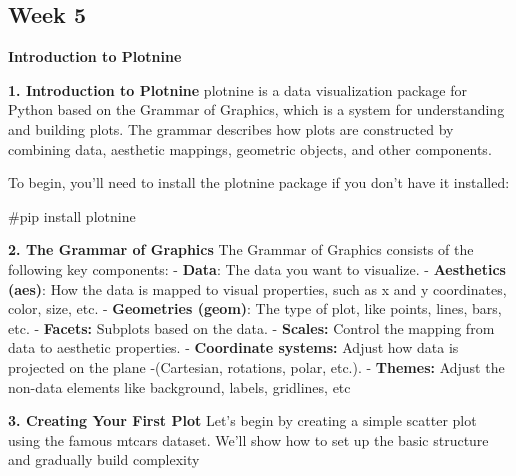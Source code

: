 \documentclass[
  letterpaper,
  DIV=11,
  numbers=noendperiod]{scrreprt}
\newenvironment{Shaded}{\begin{snugshade}}{\end{snugshade}}
\newcommand{\CommentTok}[1]{\textcolor[rgb]{0.37,0.37,0.37}{#1}}
\begin{document}
\begin{Shaded}
\begin{Highlighting}[]

\end{Highlighting}
\end{Shaded}

\begin{Shaded}
\begin{Highlighting}[]

\end{Highlighting}
\end{Shaded}

\subsection{Week 5}\label{week-5-4}

\textbf{Introduction to Plotnine}

\textbf{1. Introduction to Plotnine} plotnine is a data visualization
package for Python based on the Grammar of Graphics, which is a system
for understanding and building plots. The grammar describes how plots
are constructed by combining data, aesthetic mappings, geometric
objects, and other components.

To begin, you'll need to install the plotnine package if you don't have
it installed:

\begin{Shaded}
\begin{Highlighting}[]
\CommentTok{\#pip install plotnine}
\end{Highlighting}
\end{Shaded}

\textbf{2. The Grammar of Graphics} The Grammar of Graphics consists of
the following key components: - \textbf{Data}: The data you want to
visualize. - \textbf{Aesthetics (aes)}: How the data is mapped to visual
properties, such as x and y coordinates, color, size, etc. -
\textbf{Geometries (geom)}: The type of plot, like points, lines, bars,
etc. - \textbf{Facets:} Subplots based on the data. - \textbf{Scales:}
Control the mapping from data to aesthetic properties. -
\textbf{Coordinate systems:} Adjust how data is projected on the plane
-(Cartesian, rotations, polar, etc.). - \textbf{Themes:} Adjust the
non-data elements like background, labels, gridlines, etc

\textbf{3. Creating Your First Plot} Let's begin by creating a simple
scatter plot using the famous mtcars dataset. We'll show how to set up
the basic structure and gradually build complexity
\end{document}
